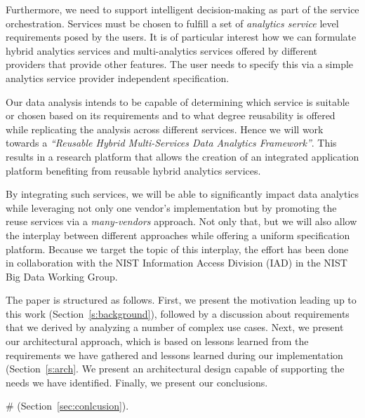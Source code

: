 Furthermore, we need to support intelligent decision-making as part of
the service orchestration. Services must be chosen to fulfill a set of
{\em analytics service} level requirements posed by the users. It is
of particular interest how we can formulate hybrid analytics services
and multi-analytics services offered by different providers that
provide other features. The user needs to specify this via a simple
analytics service provider independent specification.

Our data analysis intends to be capable of determining which service is
suitable or chosen based on its requirements and to what degree
reusability is offered while replicating the analysis across different
services. Hence we will work towards a {\em ``Reusable Hybrid
Multi-Services Data Analytics Framework''}. This results in a research
platform that allows the creation of an integrated application
platform benefiting from reusable hybrid analytics services.


By integrating such services, we will be able to significantly impact
data analytics while leveraging not only one vendor's implementation
but by promoting the reuse services via a {\em many-vendors}
approach. Not only that, but we will also allow the interplay between
different approaches while offering a uniform specification platform.
Because we target the topic of this interplay, the effort has been
done in collaboration with the NIST Information Access Division (IAD)
in the NIST Big Data Working Group.%

The paper is structured as follows. First, we present the motivation
leading up to this work (Section~\ref{s:background}), followed by a
discussion about requirements that we derived by analyzing a number of
complex use cases. Next, we present our architectural approach, which is
based on lessons learned from the requirements we have gathered and
lessons learned during our implementation (Section~\ref{s:arch}. We
present an architectural design capable of supporting the needs we
have identified. Finally, we present our conclusions.

# (Section~\ref{sec:conlcusion}).
